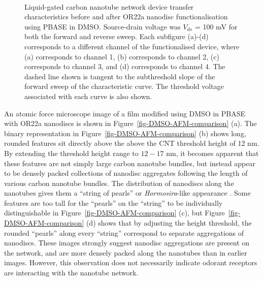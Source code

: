 \documentclass[
  a4paper,
]{scrbook}
\begin{document}
\begin{figure}
\begin{minipage}[t]{0.45\linewidth}
{{}

}

\end{minipage}%
%
\begin{minipage}[t]{0.01\linewidth}

{\centering 

~

}

\end{minipage}%

\caption[Liquid-gated carbon nanotube network device transfer
characteristics before and after OR22a nanodisc functionalisation using
PBASE in DMSO, with threshold voltage corresponding to each transfer
curve also shown.]{\label{fig-DMSO-TX}Liquid-gated carbon nanotube
network device transfer characteristics before and after OR22a nanodisc
functionalisation using PBASE in DMSO. Source-drain voltage was
\(V_{ds}\) = 100 mV for both the forward and reverse sweep. Each
subfigure (a)-(d) corresponds to a different channel of the
functionalised device, where (a) corresponds to channel 1, (b)
corresponds to channel 2, (c) corresponds to channel 3, and (d)
corresponds to channel 4. The dashed line shown is tangent to the
subthreshold slope of the forward sweep of the characteristic curve. The
threshold voltage associated with each curve is also shown.}

\end{figure}

An atomic force microscope image of a film modified using DMSO in PBASE
with OR22a nanodiscs is shown in Figure~\ref{fig-DMSO-AFM-comparison}
(a). The binary representation in Figure~\ref{fig-DMSO-AFM-comparison}
(b) shows long, rounded features sit directly above the above the CNT
threshold height of 12 nm. By extending the threshold height range to
\(12-17\) nm, it becomes apparent that these features are not simply
large carbon nanotube bundles, but instead appear to be densely packed
collections of nanodisc aggregates following the length of various
carbon nanotube bundles. The distribution of nanodiscs along the
nanotubes gives them a ``string of pearls'' or \emph{Hormosira}-like
appearance \autocite{NewZealandPlantConservationNetwork}. Some features
are too tall for the ``pearls'' on the ``string'' to be individually
distinguishable in Figure~\ref{fig-DMSO-AFM-comparison} (c), but
Figure~\ref{fig-DMSO-AFM-comparison} (d) shows that by adjusting the
height threshold, the rounded ``pearls'' along every ``string''
correspond to separate aggregations of nanodiscs. These images strongly
suggest nanodisc aggregations are present on the network, and are more
densely packed along the nanotubes than in earlier images. However, this
observation does not necessarily indicate odorant receptors are
interacting with the nanotube network.
\end{document}
